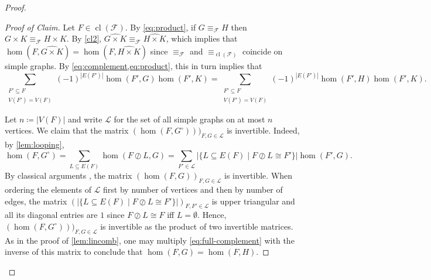 \documentclass[3p,final]{elsarticle}
\DeclareMathOperator{\cl}{cl}
\newenvironment{claimproof}[1][Proof of Claim]{\begin{proof}[#1] \renewcommand{\qedsymbol}{$\lrcorner$}}{ \end{proof}}
\begin{document}
\begin{proof}
\begin{claimproof}
			Let $F \in \cl(\mathcal{F})$.
			By \cref{eq:product}, if $G \equiv_{\mathcal{F}} H$ then 
			$G \times K \equiv_{\mathcal{F}} H \times K$.
			By \ref{cl2}, $\widehat{G \times K} \equiv_{\mathcal{F}} \widehat{H \times K}$, which implies that $\hom(F, \widehat{G \times K}) = \hom(F, \widehat{H \times K})$ since $\equiv_{\mathcal{F}}$ and $\equiv_{\cl(\mathcal{F})}$ coincide on simple graphs.
			By \cref{eq:complement,eq:product}, this in turn implies that
			\begin{equation} \label{eq:full-complement}
				\sum_{\substack{F' \subseteq F \\ V(F') = V(F)}} (-1)^{|E(F')|} \hom(F', G)\hom(F', K)  = \sum_{\substack{F' \subseteq F \\ V(F') = V(F)}} (-1)^{|E(F')|} \hom(F', H)\hom(F', K).
			\end{equation}
%			
			
			Let $n \coloneqq |V(F)|$ and write $\mathcal{L}$ for the set of all simple graphs on at most $n$ vertices. We claim that the matrix $(\hom(F, G^\circ)))_{F, G \in \mathcal{L}}$ is invertible. Indeed, by \cref{lem:looping},
			\[
			\hom(F, G^\circ) = \sum_{L \subseteq E(F)} \hom(F \oslash L, G)
			= \sum_{F' \in \mathcal{L}} |\{L \subseteq E(F) \mid F \oslash L \cong F'\}| \hom(F', G).
			\]
			By classical arguments \cite{lovasz_operations_1967}, the matrix $(\hom(F, G))_{F, G \in \mathcal{L}}$ is invertible. When ordering the elements of $\mathcal{L}$ first by number of vertices and then by number of edges, the matrix $(|\{L \subseteq E(F) \mid F \oslash L \cong F'\}|)_{F, F' \in \mathcal{L}}$ is upper triangular and all its diagonal entries are $1$ since $F \oslash L \cong F$ iff $L = \emptyset$. Hence, $(\hom(F, G^\circ)))_{F, G \in \mathcal{L}}$ is invertible as the product of two invertible matrices.
			As in the proof of \cref{lem:lincomb},
			one may multiply \cref{eq:full-complement} with the inverse of this matrix to conclude that $\hom(F, G) = \hom(F, H)$.
		\end{claimproof}
		

\end{proof}
\end{document}
